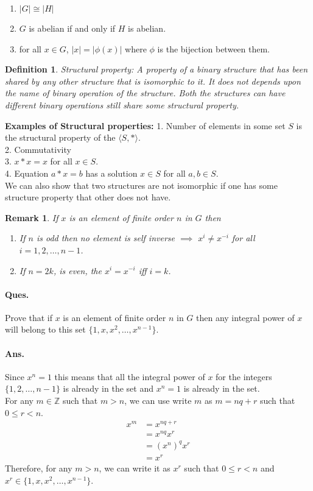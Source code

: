 \documentclass[12pt]{report}
\newtheorem{defn}{Definition}
\newtheorem*{rem}{Remark}
\begin{document}
\begin{enumerate}
    \item $|G| \cong |H|$
    \item $G$ is abelian if and only if $H$ is abelian.
    \item for all $x \in G$, $|x| = |\phi(x)|$ where $\phi$ is the bijection between them.
\end{enumerate}
\begin{defn}
    Structural property: A property of a binary structure that has been shared by any other structure that is isomorphic to it. It does not depends upon the name of binary operation of the structure. Both the structures can have different binary operations still share some structural property.
\end{defn}
\textbf{Examples of Structural properties: }
1. Number of elements in some set $S$ is the structural property of the $\langle S, * \rangle$.\\
2. Commutativity\\
3. $x * x = x$ for all $x \in S$.\\
4. Equation $a * x = b$ has a solution $x \in S$ for all $a,b \in S$.\\ 
We can also show that two structures are not isomorphic if one has some structure property that other does not have.
\begin{rem}
    If $x$ is an element of finite order $n$ in $G$ then
    \begin{enumerate}
        \item If $n$ is odd then no element is self inverse $\implies$ $x^i \neq x^{-i}$ for all $i = 1,2,\dots,n-1$.
        \item If $n = 2k$, is even, the $x^i = x^{-i}$ iff $i = k$.
    \end{enumerate}
\end{rem}
\paragraph*{Ques. }Prove that if $x$ is an element of finite order $n$ in $G$ then any integral power of $x$ will belong to this set $\{1, x, x^2, \dots, x^{n-1}\}$.
\paragraph*{Ans. } Since $x^n = 1$ this means that all the integral power of $x$ for the integers $\{1,2, \dots, n-1\}$ is already in the set and $x^n = 1$ is already in the set. \\
For any $m \in \mathbb{Z}$ such that $ m > n$, we can use write $m$ as $ m = nq + r$ such that $ 0 \leq r < n$.
\begin{align*}
    x^m &= x^{nq+r}\\
    &= x^{nq} x^r\\
    &= (x^n)^q x^r\\
    &= x^r
\end{align*}
Therefore, for any $m > n$, we can write it as $x^r$ such that $ 0 \leq r < n$ and $x^r \in \{1, x, x^2, \dots, x^{n-1}\}$.
\end{document}

